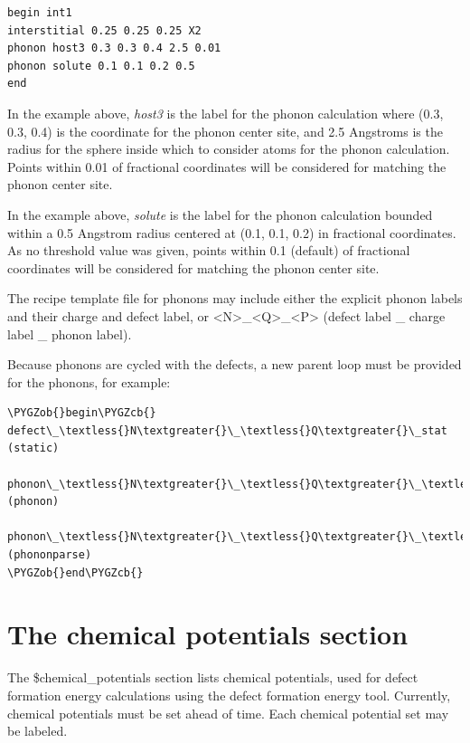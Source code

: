 \documentclass[letterpaper,10pt,english]{sphinxmanual}
\def\PYGZob{\char`\{}
\def\PYGZcb{\char`\}}
\begin{document}
\begin{Verbatim}[commandchars=\\\{\}]
begin int1
interstitial 0.25 0.25 0.25 X2
phonon host3 0.3 0.3 0.4 2.5 0.01
phonon solute 0.1 0.1 0.2 0.5
end
\end{Verbatim}

In the example above, \emph{host3} is the label for the phonon calculation where (0.3, 0.3, 0.4) is the coordinate for the phonon center site, and 2.5 Angstroms is the radius for the sphere inside which to consider atoms for the phonon calculation. Points within 0.01 of fractional coordinates will be considered for matching the phonon center site.

In the example above, \emph{solute} is the label for the phonon calculation bounded within a 0.5 Angstrom radius centered at (0.1, 0.1, 0.2) in fractional coordinates. As no threshold value was given, points within 0.1 (default) of fractional coordinates will be considered for matching the phonon center site.

The recipe template file for phonons may include either the explicit phonon labels and their charge and defect label, or \textless{}N\textgreater{}\_\textless{}Q\textgreater{}\_\textless{}P\textgreater{} (defect label \_ charge label \_ phonon label).

Because phonons are cycled with the defects, a new parent loop must be provided for the phonons, for example:

\begin{Verbatim}[commandchars=\\\{\}]
\PYGZob{}begin\PYGZcb{}
defect\_\textless{}N\textgreater{}\_\textless{}Q\textgreater{}\_stat (static)
    phonon\_\textless{}N\textgreater{}\_\textless{}Q\textgreater{}\_\textless{}P\textgreater{} (phonon)
        phonon\_\textless{}N\textgreater{}\_\textless{}Q\textgreater{}\_\textless{}P\textgreater{}\_parse (phononparse)
\PYGZob{}end\PYGZcb{}
\end{Verbatim}


\section{The chemical potentials section}
\label{3_0_inputfile:the-chemical-potentials-section}
The \$chemical\_potentials section lists chemical potentials, used for defect formation energy calculations using the defect formation energy tool.
Currently, chemical potentials must be set ahead of time. Each chemical potential set may be labeled.
\end{document}
